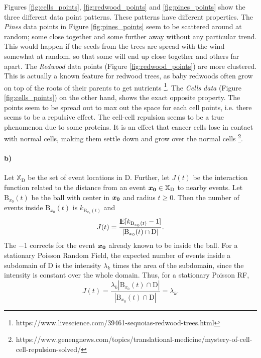 Figures \ref{fig:cells_points}, \ref{fig:redwood_points} and \ref{fig:pines_points} show the three different data point patterns. These patterns have different properties. The \textit{Pines} data points in Figure \ref{fig:pines_points} seem to be scattered around at random; some close together and some further away without any particular trend. This would happen if the seeds from the trees are spread with the wind somewhat at random, so that some will end up close together and others far apart. The \textit{Redwood} data points (Figure \ref{fig:redwood_points}) are more clustered. This is actually a known feature for redwood trees, as baby redwoods often grow on top of the roots of their parents to get nutrients \footnote{https://www.livescience.com/39461-sequoias-redwood-trees.html}. The \textit{Cells data} (Figure \ref{fig:cells_points}) on the other hand, shows the exact opposite property. The points seem to be spread out to max out the space for each cell points, i.e. there seems to be a repulsive effect. The cell-cell repulsion seems to be a true phenomenon due to some proteins. It is an effect that cancer cells lose in contact with normal cells, making them settle down and grow over the normal cells \footnote{https://www.genengnews.com/topics/translational-medicine/mystery-of-cell-cell-repulsion-solved/}.

\paragraph{b)}

Let $\mathbb{X}_{\textrm{D}}$ be the set of event locations in $\textrm{D}$. Further, let $J(t)$ be the interaction function related to the distance from an event $\bm{x_0} \in \mathbb{X}_{\textrm{D}}$ to nearby events. Let $\textrm{B}_{x_0}(t)$ be the ball with center in $\bm{x_0}$ and radius $t \geq 0$. Then the number of events inside $\textrm{B}_{x_0}(t)$ is $k_{\textrm{B}_{x_0}(t)}$ and
\begin{equation}
    J(t) = \frac{{\rm I\kern-.3em E}{[k_{\textrm{B}_{x_0}(t)}-1]}}{|\textrm{B}_{x_0}(t) \cap \textrm{D}|}.
\end{equation}
The $-1$ corrects for the event $\bm{x_0}$ already known to be inside the ball. For a stationary Poisson Random Field, the expected number of events inside a subdomain of D is the intensity $\lambda_k$ times the area of the subdomain, since the intensity is constant over the whole domain. Thus, for a stationary Poisson RF, 
\begin{equation}
    J(t) = \frac{\lambda_k |\textrm{B}_{x_0}(t) \cap \textrm{D}|}{|\textrm{B}_{x_0}(t) \cap \textrm{D}|} = \lambda_k.
\end{equation}

